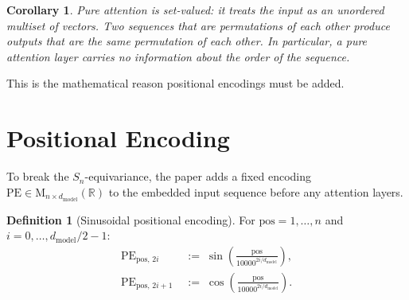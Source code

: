\documentclass[11pt]{amsart}
\theoremstyle{plain}
\newtheorem{corollary}[theorem]{Corollary}
\theoremstyle{definition}
\newtheorem{definition}[theorem]{Definition}
\newcommand{\R}{\mathbb{R}}
\newcommand{\Mat}[2]{\mathrm{M}_{#1 \times #2}(\R)}
\begin{document}
\begin{corollary}
Pure attention is \emph{set-valued}: it treats the input as an unordered
multiset of vectors.  Two sequences that are permutations of each other produce
outputs that are the same permutation of each other.  In particular, a pure
attention layer carries no information about the \emph{order} of the sequence.
\end{corollary}

This is the mathematical reason positional encodings must be added.

\section{Positional Encoding}
\label{sec:pe}

To break the $S_n$-equivariance, the paper adds a fixed encoding
$\mathrm{PE} \in \Mat{n}{d_{\mathrm{model}}}$ to the embedded input sequence
before any attention layers.

\begin{definition}[Sinusoidal positional encoding]
\label{def:pe}
For $\mathrm{pos} = 1, \ldots, n$ and $i = 0, \ldots, d_{\mathrm{model}}/2 - 1$:
\begin{align*}
    \mathrm{PE}_{\mathrm{pos},\,2i}   &\;:=\; \sin\!\left(
        \frac{\mathrm{pos}}{10000^{2i/d_{\mathrm{model}}}}\right), \\
    \mathrm{PE}_{\mathrm{pos},\,2i+1} &\;:=\; \cos\!\left(
        \frac{\mathrm{pos}}{10000^{2i/d_{\mathrm{model}}}}\right).
\end{align*}
\end{definition}
\end{document}
